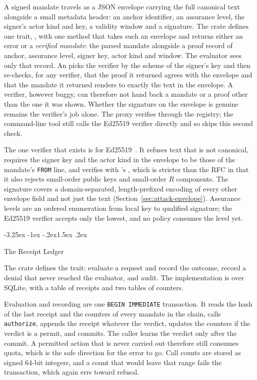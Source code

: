 \documentclass[10pt,twocolumn]{article}
\makeatletter
\theoremstyle{plain}
\theoremstyle{definition}
\renewcommand\subsection{\@startsection{subsection}{2}{\z@}%
  {-3.25ex \@plus -1ex \@minus -.2ex}{1.5ex \@plus .2ex}%
  {\normalfont\large\bfseries\raggedright}}
\makeatother
\begin{document}
A signed mandate travels as a JSON envelope carrying the full canonical text alongside a small metadata header: an anchor identifier, an assurance level, the signer's actor kind and key, a validity window and a signature. The crate  defines one trait, , with one method that takes such an envelope and returns either an error or a \emph{verified mandate}: the parsed mandate alongside a proof record of anchor, assurance level, signer key, actor kind and window. The evaluator sees only that record. An  picks the verifier by the scheme of the signer's key and then re-checks, for any verifier, that the proof it returned agrees with the envelope and that the mandate it returned renders to exactly the text in the envelope. A verifier, however buggy, can therefore not hand back a mandate or a proof other than the one it was shown. Whether the signature on the envelope is genuine remains the verifier's job alone. The proxy verifies through the registry; the command-line tool still calls the Ed25519 verifier directly and so skips this second check.

The one verifier that exists is for Ed25519~\cite{rfc8032}. It refuses text that is not canonical, requires the signer key and the actor kind in the envelope to be those of the mandate's \texttt{FROM} line, and verifies with 's , which is stricter than the RFC in that it also rejects small-order public keys and small-order $R$ components. The signature covers a domain-separated, length-prefixed encoding of every other envelope field and not just the text (Section~\ref{sec:attack-envelope}). Assurance levels are an ordered enumeration from local key to qualified signature; the Ed25519 verifier accepts only the lowest, and no policy consumes the level yet.

\subsection{The Receipt Ledger}
\label{sec:ledger}

The crate  defines the  trait: evaluate a request and record the outcome, record a denial that never reached the evaluator, and audit. The implementation is over SQLite, with a table of receipts and two tables of counters.

Evaluation and recording are one \texttt{BEGIN IMMEDIATE} transaction. It reads the hash of the last receipt and the counters of every mandate in the chain, calls \texttt{authorize}, appends the receipt whatever the verdict, updates the counters if the verdict is a permit, and commits. The caller learns the verdict only after the commit. A permitted action that is never carried out therefore still consumes quota, which is the safe direction for the error to go. Call counts are stored as signed 64-bit integers, and a count that would leave that range fails the transaction, which again errs toward refusal.
\end{document}
